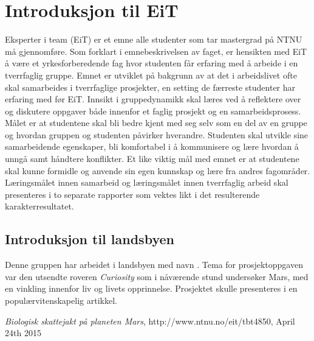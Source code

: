 \section{Introduksjon til EiT}

Eksperter i team (EiT) er et emne alle studenter som tar mastergrad på NTNU må gjennomføre.
Som forklart i emnebeskrivelsen\cite{eitlaeringsmaal} av faget, er hensikten med EiT å være et yrkesforberedende fag hvor studenten får erfaring med å arbeide i en tverrfaglig gruppe.
Emnet er utviklet på bakgrunn av at det i arbeidslivet ofte skal samarbeides i tverrfaglige prosjekter, en setting de færreste studenter har erfaring med før EiT.
Innsikt i gruppedynamikk skal læres ved å reflektere over og diskutere oppgaver både innenfor et faglig prosjekt og en samarbeidsprosess.
Målet er at studentene skal bli bedre kjent med seg selv som en del av en gruppe og hvordan gruppen og studenten påvirker hverandre.
Studenten skal utvikle sine samarbeidende egenskaper, bli komfortabel i å kommunisere og lære hvordan å unngå samt håndtere konflikter.
Et like viktig mål med emnet er at studentene skal kunne formidle og anvende sin egen kunnskap og lære fra andres fagområder.
Læringsmålet innen samarbeid og læringsmålet innen tverrfaglig arbeid skal presenteres i to separate rapporter som vektes likt i det resulterende karakterresultatet.

\subsection{Introduksjon til landsbyen}

Denne gruppen har arbeidet i landsbyen med navn \cite{landsby}. 
Tema for prosjektoppgaven var den utsendte roveren \textit{Curiosity} som i nåværende stund undersøker Mars, med en vinkling innenfor liv og livets opprinnelse.
Prosjektet skulle presenteres i en populærvitenskapelig artikkel.


		\emph{Biologisk skattejakt på planeten Mars},
		http://www.ntnu.no/eit/tbt4850,
		April 24th 2015